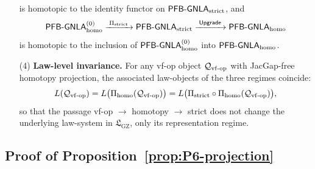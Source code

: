 \documentclass[11pt]{book}
\theoremstyle{plain}
\theoremstyle{definition}
\newcommand{\GZLS}{\ensuremath{\mathfrak{L}_{\mathrm{GZ}}}}       \newcommand{\GZLT}{\ensuremath{M_{!w}}}                           \newcommand{\GZLOC}{\ensuremath{A_M}}                             \newcommand{\GZLCurv}{\ensuremath{\mathcal{F}_{\mathrm{law}}}}
\begin{document}
\begin{proposition}
\begin{enumerate}
\[    \]
    is homotopic to the identity functor on
    \(\mathsf{PFB\text- GNLA}_{\mathrm{strict}}\), and
    \[
      \mathsf{PFB\text- GNLA}_{\mathrm{homo}}^{(0)}
      \xrightarrow{\;\Pi_{\mathrm{strict}}\;}
      \mathsf{PFB\text- GNLA}_{\mathrm{strict}}
      \xrightarrow{\;\mathsf{Upgrade}\;}
      \mathsf{PFB\text- GNLA}_{\mathrm{homo}}
    \]
    is homotopic to the inclusion of
    \(\mathsf{PFB\text- GNLA}_{\mathrm{homo}}^{(0)}\) into
    \(\mathsf{PFB\text- GNLA}_{\mathrm{homo}}\).
  \item[\textnormal{(4)}] \textbf{Law-level invariance.}
    For any vf-op object \(\mathcal{Q}_{\mathrm{vf\text- op}}\) with
    JacGap-free homotopy projection, the associated law-objects of the
    three regimes coincide:
    \[
      L(\mathcal{Q}_{\mathrm{vf\text- op}})
      =
      L\bigl(\Pi_{\mathrm{homo}}(\mathcal{Q}_{\mathrm{vf\text- op}})\bigr)
      =
      L\bigl(\Pi_{\mathrm{strict}}\circ
              \Pi_{\mathrm{homo}}(\mathcal{Q}_{\mathrm{vf\text- op}})
        \bigr),
    \]
    so that the passage vf-op \(\to\) homotopy \(\to\) strict does not
    change the underlying law-system in \(\GZLS\), only its
    representation regime.
\end{enumerate}
\end{proposition}



\subsection*{Proof of Proposition~\ref{prop:P6-projection}}
\end{document}
